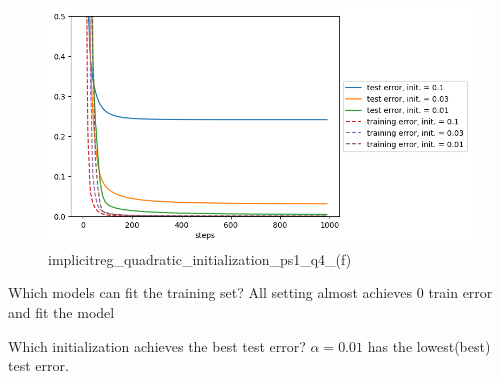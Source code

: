 
\begin{answer}

\begin{figure}[H]
    \centering
    \includegraphics[width=0.5\linewidth]{implicitreg_quadratic_initialization.png}
    \caption{implicitreg\_quadratic\_initialization\_ps1\_q4\_(f)}
    \label{fig:enter-label}
\end{figure}
Which models can fit the training set?  All setting almost achieves 0 train error and fit the model

Which initialization achieves the best test error? $\alpha = 0.01$ has the lowest(best) test error. 
\end{answer}